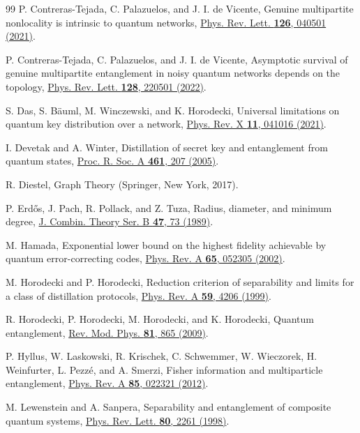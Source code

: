 \documentclass[a4paper,onecolumn,accepted=2024-12-14]{quantumarticle}
\theoremstyle{plain}
\begin{document}
\begin{thebibliography}{99}
 P. Contreras-Tejada, C. Palazuelos, and J. I. de Vicente, Genuine multipartite nonlocality is intrinsic to quantum networks, \href{https://doi.org/10.1103/PhysRevLett.126.040501}{Phys. Rev. Lett. \textbf{126}, 040501 (2021)}.
    
 P. Contreras-Tejada, C. Palazuelos, and J. I. de Vicente, Asymptotic survival of genuine multipartite entanglement in noisy
  quantum networks depends on the topology, \href{https://doi.org/10.1103/PhysRevLett.128.220501}{Phys. Rev. Lett. \textbf{128}, 220501 (2022)}.
  
 S. Das, S. B{\"a}uml, M. Winczewski, and K. Horodecki, Universal limitations on quantum key distribution over a network, \href{https://doi.org/10.1103/PhysRevX.11.041016}{Phys. Rev. X \textbf{11}, 041016 (2021)}.
    
 I. Devetak and A. Winter, Distillation of secret key and entanglement from quantum states, \href{https://doi.org/10.1098/rspa.2004.1372}{Proc. R. Soc. A \textbf{461}, 207 (2005)}.

 R. Diestel, Graph Theory (Springer, New York, 2017).

 P. Erd\H{o}s, J. Pach, R. Pollack, and Z. Tuza, Radius, diameter, and minimum degree, \href{https://doi.org/10.1016/0095-8956(89)90066-X}{J. Combin. Theory Ser. B \textbf{47}, 73 (1989)}.

 M. Hamada, Exponential lower bound on the highest fidelity achievable by quantum error-correcting codes, \href{https://doi.org/10.1103/PhysRevA.65.052305}{Phys. Rev. A \textbf{65}, 052305 (2002)}.

 M. Horodecki and P. Horodecki, Reduction criterion of separability and limits for a class of
  distillation protocols, \href{https://doi.org/10.1103/PhysRevA.59.4206}{Phys. Rev. A \textbf{59}, 4206 (1999)}.
  
 R. Horodecki, P. Horodecki, M. Horodecki, and K. Horodecki, Quantum entanglement, \href{https://doi.org/10.1103/RevModPhys.81.865}{Rev. Mod. Phys. \textbf{81}, 865 (2009)}.

 P. Hyllus, W. Laskowski, R. Krischek, C. Schwemmer, W. Wieczorek, H. Weinfurter, L. Pezz\'{e}, and A. Smerzi, Fisher information and multiparticle entanglement, \href{https://doi.org/10.1103/PhysRevA.85.022321}{Phys. Rev. A \textbf{85}, 022321 (2012)}.
    
 M. Lewenstein and A. Sanpera, Separability and entanglement of composite quantum systems, \href{https://doi.org/10.1103/PhysRevLett.80.2261}{Phys. Rev. Lett. \textbf{80}, 2261 (1998)}.


\end{thebibliography}
\end{document}
